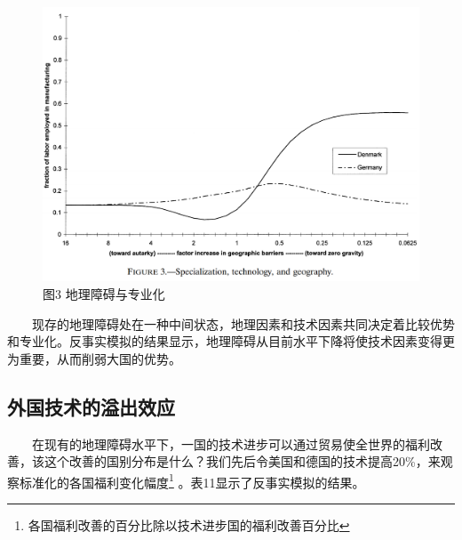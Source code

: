 \documentclass[]{tufte-handout}
\begin{document}
\begin{figure}

{\centering \includegraphics[width=1\linewidth]{Figures/Figure3} 

}

\caption[图3 地理障碍与专业化]{图3 地理障碍与专业化}\label{fig:Figure3}
\end{figure}

　　现存的地理障碍处在一种中间状态，地理因素和技术因素共同决定着比较优势和专业化。反事实模拟的结果显示，地理障碍从目前水平下降将使技术因素变得更为重要，从而削弱大国的优势。

\hypertarget{ux5916ux56fdux6280ux672fux7684ux6ea2ux51faux6548ux5e94}{%
\subsection{外国技术的溢出效应}\label{ux5916ux56fdux6280ux672fux7684ux6ea2ux51faux6548ux5e94}}

　　在现有的地理障碍水平下，一国的技术进步可以通过贸易使全世界的福利改善，该这个改善的国别分布是什么？我们先后令美国和德国的技术提高20\%，来观察标准化的各国福利变化幅度\footnote{各国福利改善的百分比除以技术进步国的福利改善百分比}
。表11显示了反事实模拟的结果。
\end{document}

